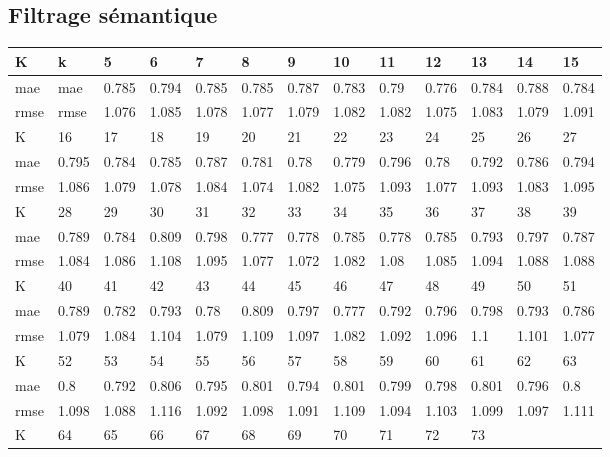 \begin{appendices}
\subsection*{Filtrage sémantique}
\begin{center} 
	\begin{tabularx}{\textwidth}{|l|X|X|X|X|X|X|X|X|X|X|X|X|} 
		\hline 
		K & k & 5 & 6 & 7 & 8 & 9 & 10 & 11 & 12 & 13 & 14 & 15 \\ \hline 
		mae & mae & 0.785 & 0.794 & 0.785 & 0.785 & 0.787 & 0.783 & 0.79 & 0.776 & 0.784 & 0.788 & 0.784 \\ \hline 
		rmse & rmse & 1.076 & 1.085 & 1.078 & 1.077 & 1.079 & 1.082 & 1.082 & 1.075 & 1.083 & 1.079 & 1.091 \\ \hline 
		\hline 
		K & 16 & 17 & 18 & 19 & 20 & 21 & 22 & 23 & 24 & 25 & 26 & 27 \\ \hline 
		mae & 0.795 & 0.784 & 0.785 & 0.787 & 0.781 & 0.78 & 0.779 & 0.796 & 0.78 & 0.792 & 0.786 & 0.794 \\ \hline 
		rmse & 1.086 & 1.079 & 1.078 & 1.084 & 1.074 & 1.082 & 1.075 & 1.093 & 1.077 & 1.093 & 1.083 & 1.095 \\ \hline 
		\hline 
		K & 28 & 29 & 30 & 31 & 32 & 33 & 34 & 35 & 36 & 37 & 38 & 39 \\ \hline 
		mae & 0.789 & 0.784 & 0.809 & 0.798 & 0.777 & 0.778 & 0.785 & 0.778 & 0.785 & 0.793 & 0.797 & 0.787 \\ \hline 
		rmse & 1.084 & 1.086 & 1.108 & 1.095 & 1.077 & 1.072 & 1.082 & 1.08 & 1.085 & 1.094 & 1.088 & 1.088 \\ \hline 
		\hline 
		K & 40 & 41 & 42 & 43 & 44 & 45 & 46 & 47 & 48 & 49 & 50 & 51 \\ \hline 
		mae & 0.789 & 0.782 & 0.793 & 0.78 & 0.809 & 0.797 & 0.777 & 0.792 & 0.796 & 0.798 & 0.793 & 0.786 \\ \hline 
		rmse & 1.079 & 1.084 & 1.104 & 1.079 & 1.109 & 1.097 & 1.082 & 1.092 & 1.096 & 1.1 & 1.101 & 1.077 \\ \hline 
		\hline 
		K & 52 & 53 & 54 & 55 & 56 & 57 & 58 & 59 & 60 & 61 & 62 & 63 \\ \hline 
		mae & 0.8 & 0.792 & 0.806 & 0.795 & 0.801 & 0.794 & 0.801 & 0.799 & 0.798 & 0.801 & 0.796 & 0.8 \\ \hline 
		rmse & 1.098 & 1.088 & 1.116 & 1.092 & 1.098 & 1.091 & 1.109 & 1.094 & 1.103 & 1.099 & 1.097 & 1.111 \\ \hline 
		\hline 
		K & 64 & 65 & 66 & 67 & 68 & 69 & 70 & 71 & 72 & 73  & &  \\ \hline 

\end{tabularx}
\end{center}
\end{appendices}
